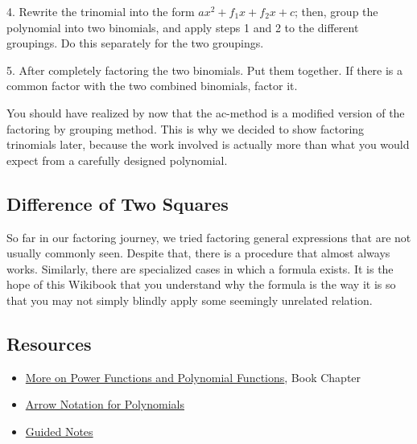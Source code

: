     4.  Rewrite the trinomial into the form $ax^{2}+f _{1}x+f _{2}x+c$; then, group the
    polynomial into two binomials, and apply steps 1 and 2 to the different groupings. Do
    this separately for the two groupings.

    5.  After completely factoring the two binomials. Put them together. If there is a
    common factor with the two combined binomials, factor it.



You should have realized by now that the ac-method is a modified version of the factoring
by grouping method. This is why we decided to show factoring trinomials later, because the
work involved is actually more than what you would expect from a carefully designed
polynomial.




\subsection{Difference of Two Squares}
\label{sss:diff-6a6d}




So far in our factoring journey, we tried factoring general expressions that are not
usually commonly seen. Despite that, there is a procedure that almost always works.
Similarly, there are specialized cases in which a formula exists. It is the hope of this
Wikibook that you understand why the formula is the way it is so that you may not simply
blindly apply some seemingly unrelated relation.




\subsection{Resources}
\label{sss:reso-55b5}




\begin{itemize}
    \item \href{https://mathresearch.utsa.edu/wikiFiles/MAT1053/More_on_Polynomial_and_Power_Functions/MAT1053_M4.1More_on_Power_Functions_and_Polynomial_Functions.pdf}{More on Power Functions and Polynomial Functions}, Book Chapter
    \item \href{https://courses.lumenlearning.com/ivytech-collegealgebra/chapter/use-arrow-notation/}{Arrow Notation for Polynomials}
    \item \href{https://mathresearch.utsa.edu/wikiFiles/MAT1053/More_on_Polynomial_and_Power_Functions/MAT1053_M4.1More_on_Power_Functions_and_Polynomial_FunctionsGN.pdf}{Guided Notes}
\end{itemize}


